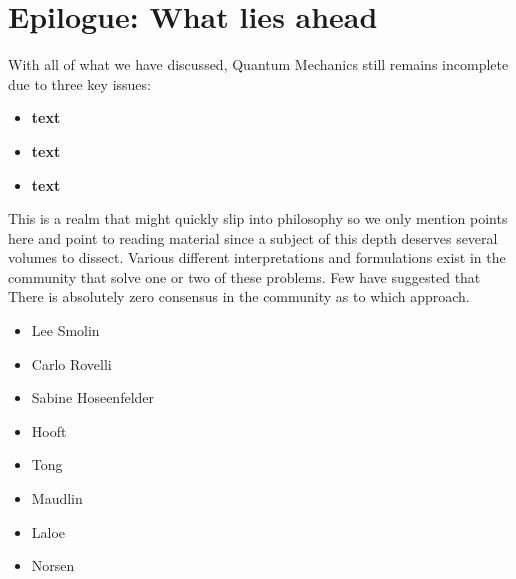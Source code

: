 \chapter{Epilogue: What lies ahead}
With all of what we have  discussed, Quantum Mechanics still remains incomplete due to three key issues: 
\begin{itemize}
\item \textbf{text}
\item \textbf{text}
\item \textbf{text}
\end{itemize}
This is a realm that might quickly slip into philosophy so we only mention points here and point to reading material since a subject of this depth deserves several volumes to dissect. Various different interpretations and formulations exist in the community that solve one or two of these problems. Few have suggested that There is absolutely zero consensus in the community as to which approach.

\begin{itemize}
\item Lee Smolin
\item Carlo Rovelli
\item Sabine Hoseenfelder
\item Hooft
\item Tong
\item Maudlin
\item Laloe
\item Norsen
\end{itemize}